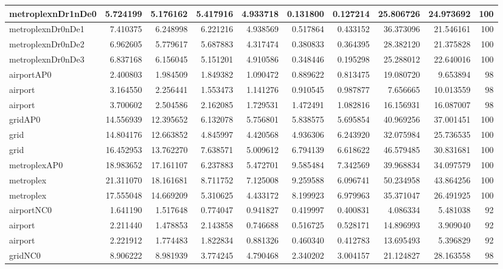 \begin{longtable}{|l|r|r|r|r|r|r|r|r|r|}
metroplexnDr1nDe0 & 5.724199 & 5.176162 & 5.417916 & 4.933718 & 0.131800 & 0.127214 & 25.806726 & 24.973692 & 100 \\ \hline
metroplexnDr0nDe1 & 7.410375 & 6.248998 & 6.221216 & 4.938569 & 0.517864 & 0.433152 & 36.373096 & 21.546161 & 100 \\ \hline
metroplexnDr0nDe2 & 6.962605 & 5.779617 & 5.687883 & 4.317474 & 0.380833 & 0.364395 & 28.382120 & 21.375828 & 100 \\ \hline
metroplexnDr0nDe3 & 6.837168 & 6.156045 & 5.151201 & 4.910586 & 0.348446 & 0.195298 & 25.288012 & 22.640016 & 100 \\ \hline
airportAP0 & 2.400803 & 1.984509 & 1.849382 & 1.090472 & 0.889622 & 0.813475 & 19.080720 & 9.653894 & 98 \\ \hline
airport & 3.164550 & 2.256441 & 1.553473 & 1.141276 & 0.910545 & 0.987877 & 7.656665 & 10.013559 & 98 \\ \hline
airport & 3.700602 & 2.504586 & 2.162085 & 1.729531 & 1.472491 & 1.082816 & 16.156931 & 16.087007 & 98 \\ \hline
gridAP0 & 14.556939 & 12.395652 & 6.132078 & 5.756801 & 5.838575 & 5.695854 & 40.969256 & 37.001451 & 100 \\ \hline
grid & 14.804176 & 12.663852 & 4.845997 & 4.420568 & 4.936306 & 6.243920 & 32.075984 & 25.736535 & 100 \\ \hline
grid & 16.452953 & 13.762270 & 7.638571 & 5.009612 & 6.794139 & 6.618622 & 46.579485 & 30.831681 & 100 \\ \hline
metroplexAP0 & 18.983652 & 17.161107 & 6.237883 & 5.472701 & 9.585484 & 7.342569 & 39.968834 & 34.097579 & 100 \\ \hline
metroplex & 21.311070 & 18.161681 & 8.711752 & 7.125008 & 9.259588 & 6.096741 & 50.234958 & 43.864256 & 100 \\ \hline
metroplex & 17.555048 & 14.669209 & 5.310625 & 4.433172 & 8.199923 & 6.979963 & 35.371047 & 26.491925 & 100 \\ \hline
airportNC0 & 1.641190 & 1.517648 & 0.774047 & 0.941827 & 0.419997 & 0.400831 & 4.086334 & 5.481038 & 92 \\ \hline
airport & 2.211440 & 1.478853 & 2.143858 & 0.746688 & 0.516725 & 0.528171 & 14.896993 & 3.909040 & 92 \\ \hline
airport & 2.221912 & 1.774483 & 1.822834 & 0.881326 & 0.460340 & 0.412783 & 13.695493 & 5.396829 & 92 \\ \hline
gridNC0 & 8.906222 & 8.981939 & 3.774245 & 4.790468 & 2.340202 & 3.004157 & 21.124827 & 28.163558 & 98 \\ \hline

\end{longtable}
